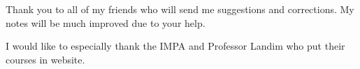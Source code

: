 \documentclass[11pt]{article}
\newcommand{\lecturer}{Claudio Landim}
\newcommand{\notetaker}{Yao Zhang}
\newcounter{lecture} \setcounter{lecture}{0}
\theoremstyle{definition}
\newcommand{\mycopyrightsymbol}{\raisebox{-0.3ex}{\tikz{\node[inner sep=0pt,outer sep=0pt] at (0,0) {\textsc{c}};\draw (0,0) circle (0.18);}}}
\numberwithin{equation}{lecture}
\begin{document}
Thank you to all of my friends  who will send me suggestions and corrections. My notes will be  much improved due to your help.

I would like to especially thank the IMPA and Professor Landim  who put their courses in website.

\medskip

%
%

\newpage


%
%
%

 

 
 


 

 
 
%
%
% 
%
% 
% 
%
%
% 
%
% 
% 
%
%
%
%
%
%
%
%
%
%
\end{document}
